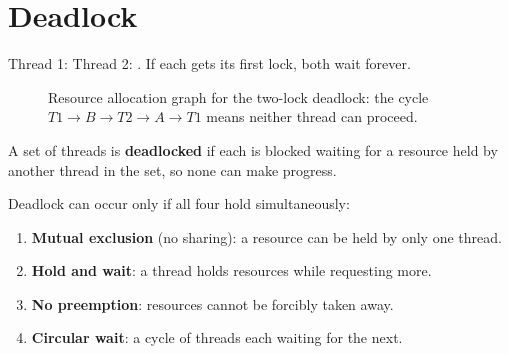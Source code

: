\section{Deadlock}

\begin{example}
Thread 1:  \quad
Thread 2: . If each gets its first lock, both wait
forever.
\end{example}

\begin{figure}[H]
\centering
{}
\caption{Resource allocation graph for the two-lock deadlock: the cycle
$T1\to B\to T2\to A\to T1$ means neither thread can proceed.}
\end{figure}

\begin{definition}[Deadlock]
A set of threads is \textbf{deadlocked} if each is blocked waiting for a resource held by
another thread in the set, so none can make progress.
\end{definition}

\begin{theorem}
Deadlock can occur only if all four hold simultaneously:
\begin{enumerate}
  \item \textbf{Mutual exclusion} (no sharing): a resource can be held by only one thread.
  \item \textbf{Hold and wait}: a thread holds resources while requesting more.
  \item \textbf{No preemption}: resources cannot be forcibly taken away.
  \item \textbf{Circular wait}: a cycle of threads each waiting for the next.
\end{enumerate}
\end{theorem}

